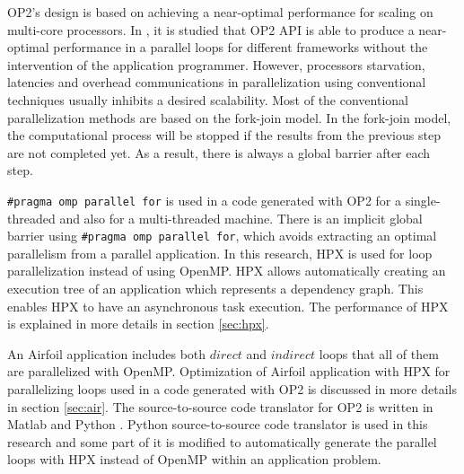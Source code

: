 \documentclass[conference]{IEEEtran}
\begin{document}
OP2's design is based on achieving a near-optimal performance for scaling on multi-core processors. In \cite{o3,o4}, it is studied that OP2 API is able to produce a near-optimal performance in a parallel loops for different frameworks without the intervention of the application programmer. However, processors starvation, latencies and overhead communications in parallelization using conventional techniques usually inhibits a desired scalability. Most of the conventional parallelization methods are based on the fork-join model. In the fork-join model, the computational process will be stopped if the results from the previous step are not completed yet. As a result, there is always a global barrier after each step. 

\texttt{\#pragma omp parallel for} is used in a code generated with OP2 for a single-threaded and also for a multi-threaded machine. There is an implicit global barrier using \texttt{\#pragma omp parallel for}, which avoids extracting an optimal parallelism from a parallel application. In this research, HPX is used for loop parallelization instead of using OpenMP.  HPX allows automatically creating an execution tree of an application which represents a dependency graph. This enables HPX to have an asynchronous task execution. The performance of HPX is explained in more details in section \ref{sec:hpx}.                                                                                                                                                                                                                                                                                                                                                                                                                                                                                                                                                                                                                                                                                                                                                                                                                            


An Airfoil application includes both $direct$ and $indirect$ loops that all of them are parallelized with OpenMP. Optimization of Airfoil application with HPX for parallelizing loops used in a code generated with OP2 is discussed in more details in section \ref{sec:air}. The source-to-source code translator for OP2 is written in Matlab and Python \cite{o3}. Python source-to-source code translator is used in this research and some part of it is modified to automatically generate the parallel loops with HPX instead of OpenMP within an application problem. 
\end{document}
